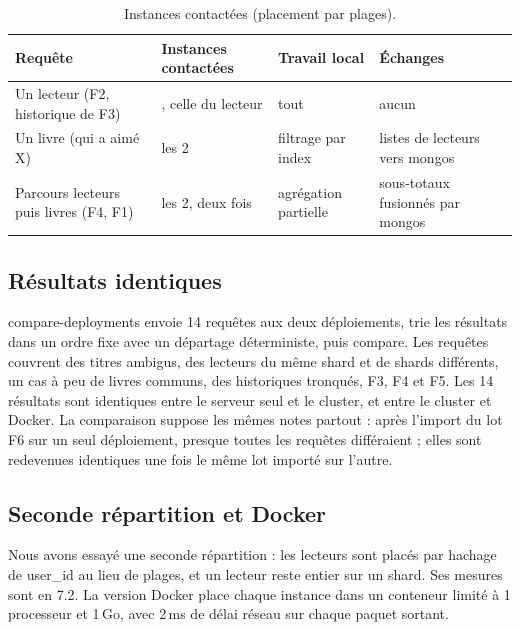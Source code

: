 \documentclass[11pt,a4paper]{article}
\begin{document}
\begin{table}[H]
\centering
\small
\begin{tabular}{>{\raggedright\arraybackslash}p{0.2683\dimexpr\linewidth-8\tabcolsep\relax}>{\raggedright\arraybackslash}p{0.2195\dimexpr\linewidth-8\tabcolsep\relax}>{\raggedright\arraybackslash}p{0.2683\dimexpr\linewidth-8\tabcolsep\relax}>{\raggedright\arraybackslash}p{0.2439\dimexpr\linewidth-8\tabcolsep\relax}}
\toprule
\textbf{Requête} & \textbf{Instances contactées} & \textbf{Travail local} & \textbf{Échanges} \\
\midrule
Un lecteur (F2, historique de F3) & 1, celle du lecteur & tout & aucun \\
\addlinespace[1pt]
Un livre (qui a aimé X) & les 2 & filtrage par index & listes de lecteurs vers mongos \\
\addlinespace[1pt]
Parcours lecteurs puis livres (F4, F1) & les 2, deux fois & agrégation partielle & sous-totaux fusionnés par mongos \\
\bottomrule
\end{tabular}
\caption{Instances contactées (placement par plages).}
\end{table}

\subsection{Résultats identiques}
compare-deployments envoie 14 requêtes aux deux déploiements, trie les résultats dans un ordre fixe avec un départage déterministe, puis compare. Les requêtes couvrent des titres ambigus, des lecteurs du même shard et de shards différents, un cas à peu de livres communs, des historiques tronqués, F3, F4 et F5. Les 14 résultats sont identiques entre le serveur seul et le cluster, et entre le cluster et Docker. La comparaison suppose les mêmes notes partout : après l'import du lot F6 sur un seul déploiement, presque toutes les requêtes différaient ; elles sont redevenues identiques une fois le même lot importé sur l'autre.

\subsection{Seconde répartition et Docker}
Nous avons essayé une seconde répartition : les lecteurs sont placés par hachage de user\_id au lieu de plages, et un lecteur reste entier sur un shard. Ses mesures sont en 7.2. La version Docker place chaque instance dans un conteneur limité à 1 processeur et 1\,Go, avec 2\,ms de délai réseau sur chaque paquet sortant.
\end{document}
